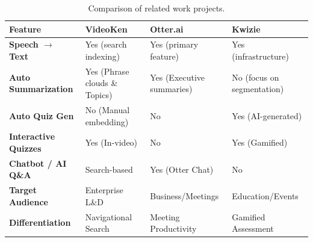 \begin{table}[h!]
    \centering
    \begin{tabular}{|p{3cm}|p{3.5cm}|p{3.5cm}|p{3.5cm}|}
        \hline
        \textbf{Feature} & \textbf{VideoKen} & \textbf{Otter.ai} & \textbf{Kwizie} \\
        \hline
        \textbf{Speech $\rightarrow$ Text} & Yes (search indexing) & Yes (primary feature) & Yes (infrastructure) \\
        \hline
        \textbf{Auto Summarization} & Yes (Phrase clouds \& Topics) & Yes (Executive summaries) & No (focus on segmentation) \\
        \hline
        \textbf{Auto Quiz Gen} & No (Manual embedding) & No & Yes (AI-generated) \\
        \hline
        \textbf{Interactive Quizzes} & Yes (In-video) & No & Yes (Gamified) \\
        \hline
        \textbf{Chatbot / AI Q\&A} & Search-based & Yes (Otter Chat) & No \\
        \hline
        \textbf{Target Audience} & Enterprise L\&D & Business/Meetings & Education/Events \\
        \hline
        \textbf{Differentiation} & Navigational Search & Meeting Productivity & Gamified Assessment \\
        \hline
    \end{tabular}
    \caption{Comparison of related work projects.}
    \label{tab:related_work_comparison}
\end{table}
